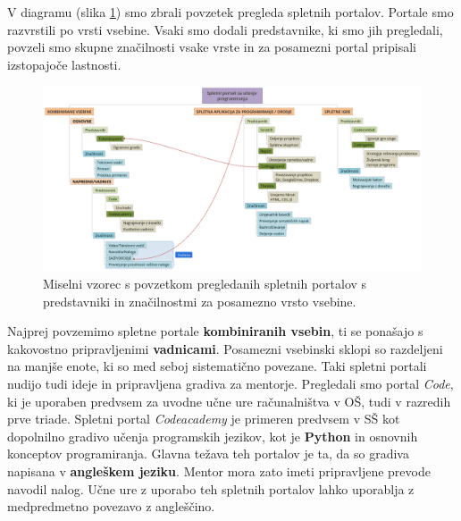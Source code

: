 V diagramu (slika \ref{fig:spup_povzetek}) smo zbrali povzetek
pregleda spletnih portalov. Portale smo razvrstili po vrsti
vsebine. Vsaki smo dodali predstavnike, ki smo jih pregledali, povzeli
smo skupne značilnosti vsake vrste in za posamezni portal pripisali
izstopajoče lastnosti.
\begin{figure}[h!]
  \centering
    \includegraphics [width=1\linewidth, keepaspectratio =
   1] {./images/SPUP_povzetek-xmind.png}
   \caption{Miselni vzorec s povzetkom pregledanih spletnih portalov s
   predstavniki in značilnostmi za posamezno vrsto vsebine.}
 \label{fig:spup_povzetek}
\end{figure}

Najprej povzemimo spletne portale \textbf{kombiniranih vsebin}, ti se ponašajo s
kakovostno pripravljenimi \textbf{vadnicami}. Posamezni vsebinski sklopi so
razdeljeni na manjše enote, ki so med seboj sistematično povezane. Taki spletni
portali nudijo tudi ideje in pripravljena gradiva za mentorje. Pregledali smo
portal \emph{Code}, ki je uporaben predvsem za uvodne učne ure računalništva v
OŠ, tudi v razredih prve triade. Spletni portal \emph{Codeacademy} je primeren
predvsem v SŠ kot dopolnilno gradivo učenja programskih jezikov, kot je
\textbf{Python} in osnovnih konceptov programiranja. Glavna težava teh portalov
je ta, da so gradiva napisana v \textbf{angleškem jeziku}. Mentor mora zato
imeti pripravljene prevode navodil nalog. Učne ure z uporabo teh spletnih
portalov lahko uporablja z medpredmetno povezavo z angleščino.

